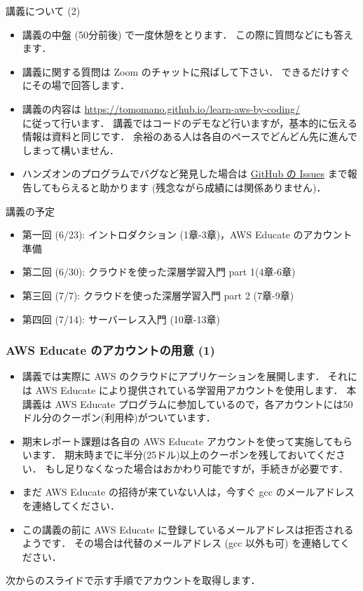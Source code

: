 \documentclass[unicode,11pt]{beamer}
\begin{document}
\begin{frame}{講義について (2)}
\begin{itemize}
    \item 講義の中盤 (50分前後) で一度休憩をとります．
    この際に質問などにも答えます．
    \item 講義に関する質問は Zoom のチャットに飛ばして下さい．
    できるだけすぐにその場で回答します．
    \item 講義の内容は
    \url{https://tomomano.github.io/learn-aws-by-coding/}\\
    に従って行います．
    講義ではコードのデモなど行いますが，基本的に伝える情報は資料と同じです．
    余裕のある人は各自のペースでどんどん先に進んでしまって構いません．
    \item ハンズオンのプログラムでバグなど発見した場合は
    \href{https://github.com/tomomano/learn-aws-by-coding/issues}{GitHub の Issues}
    まで報告してもらえると助かります (残念ながら成績には関係ありません)．
\end{itemize}

\end{frame}

\begin{frame}{講義の予定}
    \begin{itemize}
        \item 第一回 (6/23): イントロダクション (1章-3章)，AWS Educate のアカウント準備
        \item 第二回 (6/30): クラウドを使った深層学習入門 part 1(4章-6章)
        \item 第三回 (7/7): クラウドを使った深層学習入門 part 2 (7章-9章)
        \item 第四回 (7/14): サーバーレス入門 (10章-13章)
    \end{itemize}
\end{frame}

\begin{frame}
\frametitle{AWS Educate のアカウントの用意 (1)}

\begin{itemize}
    \item 講義では実際に AWS のクラウドにアプリケーションを展開します．
    それには AWS Educate により提供されている学習用アカウントを使用します．
    本講義は AWS Educate プログラムに参加しているので，各アカウントには50ドル分のクーポン(利用枠)がついています．
    \item {\color{red} 期末レポート課題は各自の AWS Educate アカウントを使って実施してもらいます．
    期末時までに半分(25ドル)以上のクーポンを残しておいてください．
    もし足りなくなった場合はおかわり可能ですが，手続きが必要です．}
    \item まだ AWS Educate の招待が来ていない人は，今すぐ gcc のメールアドレスを連絡してください．
    \item この講義の前に AWS Educate に登録しているメールアドレスは拒否されるようです．
    その場合は代替のメールアドレス (gcc 以外も可) を連絡してください．
\end{itemize}

次からのスライドで示す手順でアカウントを取得します．

\end{frame}
\end{document}
